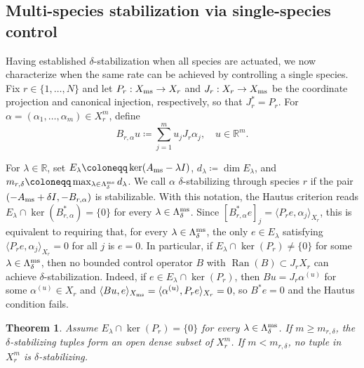 \documentclass[letterpaper, 10pt, conference]{ieeeconf}
\newtheorem{theorem}{Theorem}[section]
\newcommand{\R}{\mathbb{R}}
\begin{document}
\subsection{Multi-species stabilization via single-species control}

Having established $\delta$-stabilization when all species are actuated, we now characterize when the same rate can be achieved by controlling a single species.
Fix $r \in \{1, \ldots, N\}$ and let $P_r : X_{\rm ms} \to X_r$ and $J_r : X_r \to X_{\rm ms}$ be the coordinate projection and canonical injection, respectively, so that $J_r^\ast = P_r$.
For $\alpha = (\alpha_1, \ldots, \alpha_m) \in X_r^m$, define
\[
B_{r,\alpha}u \coloneqq \sum_{j=1}^m u_j J_r \alpha_j, \quad u \in \R^m.
\]

For $\lambda \in \R$, set $E_\lambda \coloneqq \ker(A_{\rm ms} - \lambda I)$, $d_\lambda \coloneqq \dim E_\lambda$, and $m_{r,\delta} \coloneqq \max_{\lambda \in \Lambda_\delta^{\rm ms}} d_\lambda$.
We call $\alpha$ $\delta$-stabilizing through species $r$ if the pair $(-A_{\rm ms} + \delta I, -B_{r,\alpha})$ is stabilizable.
With this notation, the Hautus criterion reads $E_\lambda \cap \ker(B_{r,\alpha}^\ast) = \{0\}$ for every $\lambda \in \Lambda_\delta^{\rm ms}$.
Since $[B_{r,\alpha}^\ast e]_j = \langle P_r e, \alpha_j \rangle_{X_r}$, this is equivalent to requiring that, for every $\lambda \in \Lambda_\delta^{\rm ms}$, the only $e \in E_\lambda$ satisfying $\langle P_r e, \alpha_j \rangle_{X_r} = 0$ for all $j$ is $e = 0$.
In particular, if $E_\lambda \cap \ker(P_r) \neq \{0\}$ for some $\lambda \in \Lambda_\delta^{\rm ms}$, then no bounded control operator $B$ with $\operatorname{Ran}(B) \subset J_r X_r$ can achieve $\delta$-stabilization.
Indeed, if $e \in E_\lambda \cap \ker(P_r)$, then $Bu = J_r \alpha^{(u)}$ for some $\alpha^{(u)} \in X_r$ and $\langle B u, e \rangle_{X_{\rm ms}} = \langle \alpha^{(u)}, P_r e \rangle_{X_r} = 0$, so $B^\ast e = 0$ and the Hautus condition fails.

\begin{theorem}
    \label{thm:delta_stabilization_one_species}
    Assume $E_\lambda \cap \ker(P_r) = \{0\}$ for every $\lambda \in \Lambda_\delta^{\rm ms}$.
    If $m \geq m_{r,\delta}$, the $\delta$-stabilizing tuples form an open dense subset of $X_r^m$.
    If $m < m_{r,\delta}$, no tuple in $X_r^m$ is $\delta$-stabilizing.
\end{theorem}
\end{document}
